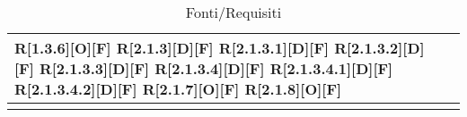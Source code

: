 \begin{longtable}{X | X}
		R[1.3.6][O][F]      \newline  
		R[2.1.3][D][F]      \newline  
		R[2.1.3.1][D][F]    \newline    
		R[2.1.3.2][D][F]    \newline    
		R[2.1.3.3][D][F]    \newline    
		R[2.1.3.4][D][F]    \newline    
		R[2.1.3.4.1][D][F]	\newline        
		R[2.1.3.4.2][D][F]  \newline      
		R[2.1.7][O][F]      \newline  
		R[2.1.8][O][F]      \newline  \\
\bottomrule
\caption{Fonti/Requisiti}
\end{longtable}   